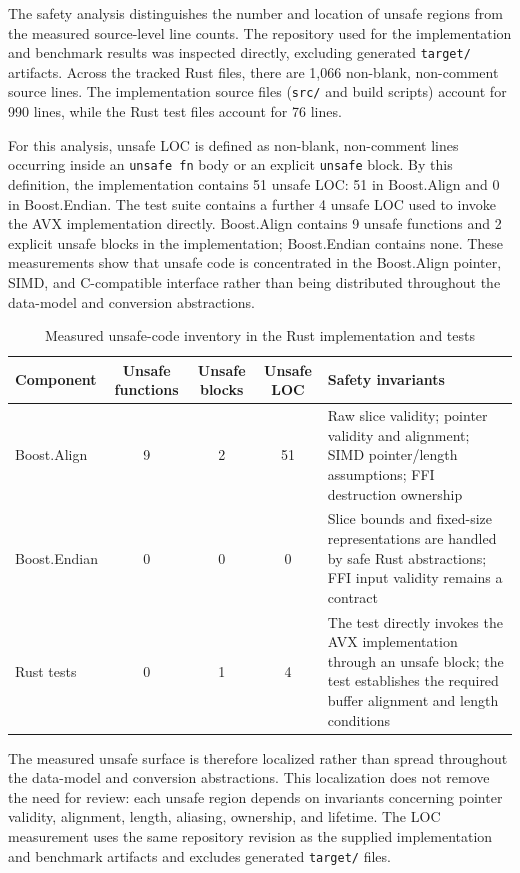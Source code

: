The safety analysis distinguishes the number and location of unsafe regions from the measured source-level line counts.
The repository used for the implementation and benchmark results was inspected directly, excluding generated \texttt{target/}
artifacts. Across the tracked Rust files, there are 1,066 non-blank, non-comment source lines. The implementation source
files (\texttt{src/} and build scripts) account for 990 lines, while the Rust test files account for 76 lines.

For this analysis, unsafe LOC is defined as non-blank, non-comment lines occurring inside an \texttt{unsafe fn} body or an
explicit \texttt{unsafe} block. By this definition, the implementation contains 51 unsafe LOC: 51 in Boost.Align and
0 in Boost.Endian. The test suite contains a further 4 unsafe LOC used to invoke the AVX implementation directly.
Boost.Align contains 9 unsafe functions and 2 explicit unsafe blocks in the implementation; Boost.Endian contains none.
These measurements show that unsafe code is concentrated in the Boost.Align pointer, SIMD, and C-compatible interface
rather than being distributed throughout the data-model and conversion abstractions.

\begin{table}[H]
\centering
\small
\renewcommand{\arraystretch}{1.2}
\setlength{\tabcolsep}{4pt}
\begin{tabularx}{\textwidth}{|l|c|c|c|X|}
\hline
\textbf{Component} & \textbf{Unsafe functions} & \textbf{Unsafe blocks} & \textbf{Unsafe LOC} & \textbf{Safety invariants} \\ \hline
Boost.Align & 9 & 2 & 51 & Raw slice validity; pointer validity and alignment; SIMD pointer/length assumptions; FFI destruction ownership \\ \hline
Boost.Endian & 0 & 0 & 0 & Slice bounds and fixed-size representations are handled by safe Rust abstractions; FFI input validity remains a contract \\ \hline
Rust tests & 0 & 1 & 4 & The test directly invokes the AVX implementation through an unsafe block; the test establishes the required buffer alignment and length conditions \\ \hline
\end{tabularx}
\caption{Measured unsafe-code inventory in the Rust implementation and tests}
\label{tab:unsafe_inventory}
\end{table}

The measured unsafe surface is therefore localized rather than spread throughout the data-model and conversion abstractions.
This localization does not remove the need for review: each unsafe region depends on invariants concerning pointer validity,
alignment, length, aliasing, ownership, and lifetime. The LOC measurement uses the same repository revision as the supplied
implementation and benchmark artifacts and excludes generated \texttt{target/} files.

